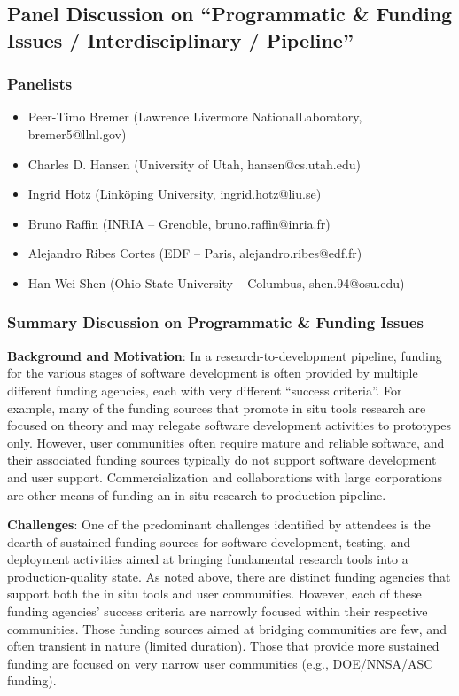 \subsection{Panel Discussion on ``Programmatic \& Funding Issues / Interdisciplinary / Pipeline''}

\subsubsection{Panelists}

\begin{itemize}
\item Peer-Timo Bremer (Lawrence Livermore NationalLaboratory, bremer5@llnl.gov)
\item Charles D. Hansen (University of Utah, hansen@cs.utah.edu)
\item Ingrid Hotz (Linköping University, ingrid.hotz@liu.se)
\item Bruno Raffin (INRIA -- Grenoble, bruno.raffin@inria.fr)
\item Alejandro Ribes Cortes (EDF -- Paris, alejandro.ribes@edf.fr)
\item Han-Wei Shen (Ohio State University -- Columbus, shen.94@osu.edu)
\end{itemize}

\subsubsection{Summary Discussion on Programmatic \& Funding Issues}

\textbf{Background and Motivation}: In a research-to-development pipeline, funding for the various stages of software development is often provided by multiple different funding agencies, each with very different “success criteria”.  For example, many of the funding sources that promote in situ tools research are focused on theory and may relegate software development activities to prototypes only. However, user communities often require mature and reliable software, and their associated funding sources typically do not support software development and user support.  Commercialization and collaborations with large corporations are other means of funding an in situ research-to-production pipeline.

\textbf{Challenges}: One of the predominant challenges identified by attendees is the dearth of sustained funding sources for software development, testing, and deployment activities aimed at bringing fundamental research tools into a production-quality state.  As noted above, there are distinct funding agencies that support both the in situ tools and user communities.  However, each of these funding agencies’ success criteria are narrowly focused within their respective communities.  Those funding sources aimed at bridging communities are few, and often transient in nature (limited duration).  Those that provide more sustained funding are focused on very narrow user communities (e.g., DOE/NNSA/ASC funding).  

